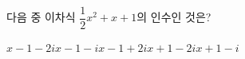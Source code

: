 다음 중 이차식 $\dfrac{1}{2}x^2+x+1$의 인수인 것은?
\begin{choices32}{$x-1-2i$}{$x-1-i$}{$x-1+2i$}{$x+1-2i$}{$x+1-i$}\end{choices32}
